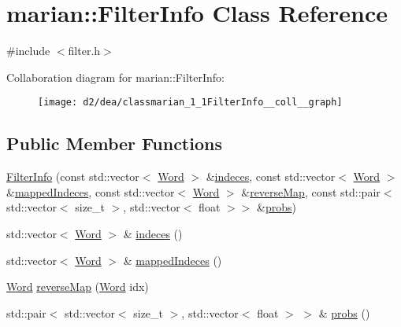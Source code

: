 \hypertarget{classmarian_1_1FilterInfo}{}\section{marian\+:\+:Filter\+Info Class Reference}
\label{classmarian_1_1FilterInfo}


{\ttfamily \#include $<$filter.\+h$>$}



Collaboration diagram for marian\+:\+:Filter\+Info\+:
\nopagebreak
\begin{figure}[H]
\begin{center}
\leavevmode
\texttt{[image: d2/dea/classmarian\_1\_1FilterInfo\_\_coll\_\_graph]}
\end{center}
\end{figure}
\subsection*{Public Member Functions}
\begin{DoxyCompactItemize}
\item 
\hyperlink{classmarian_1_1FilterInfo_af23c09dfff5d64cbc6650f1dddd33fb8}{Filter\+Info} (const std\+::vector$<$ \hyperlink{namespacemarian_a5db8bee455c97a62d6a525dc48efe4c2}{Word} $>$ \&\hyperlink{classmarian_1_1FilterInfo_a3c1418d7da057c05e4f4de7550cafc61}{indeces}, const std\+::vector$<$ \hyperlink{namespacemarian_a5db8bee455c97a62d6a525dc48efe4c2}{Word} $>$ \&\hyperlink{classmarian_1_1FilterInfo_a4fca6ec9c8444f4fe99600d97785ce7f}{mapped\+Indeces}, const std\+::vector$<$ \hyperlink{namespacemarian_a5db8bee455c97a62d6a525dc48efe4c2}{Word} $>$ \&\hyperlink{classmarian_1_1FilterInfo_a160eaa660126b9c443a3f4797d8a663e}{reverse\+Map}, const std\+::pair$<$ std\+::vector$<$ size\+\_\+t $>$, std\+::vector$<$ float $>$$>$ \&\hyperlink{classmarian_1_1FilterInfo_aaa0bce506c3f314cb8f3a968fde0f888}{probs})
\item 
std\+::vector$<$ \hyperlink{namespacemarian_a5db8bee455c97a62d6a525dc48efe4c2}{Word} $>$ \& \hyperlink{classmarian_1_1FilterInfo_a3c1418d7da057c05e4f4de7550cafc61}{indeces} ()
\item 
std\+::vector$<$ \hyperlink{namespacemarian_a5db8bee455c97a62d6a525dc48efe4c2}{Word} $>$ \& \hyperlink{classmarian_1_1FilterInfo_a4fca6ec9c8444f4fe99600d97785ce7f}{mapped\+Indeces} ()
\item 
\hyperlink{namespacemarian_a5db8bee455c97a62d6a525dc48efe4c2}{Word} \hyperlink{classmarian_1_1FilterInfo_a160eaa660126b9c443a3f4797d8a663e}{reverse\+Map} (\hyperlink{namespacemarian_a5db8bee455c97a62d6a525dc48efe4c2}{Word} idx)
\item 
std\+::pair$<$ std\+::vector$<$ size\+\_\+t $>$, std\+::vector$<$ float $>$ $>$ \& \hyperlink{classmarian_1_1FilterInfo_aaa0bce506c3f314cb8f3a968fde0f888}{probs} ()
\end{DoxyCompactItemize}
